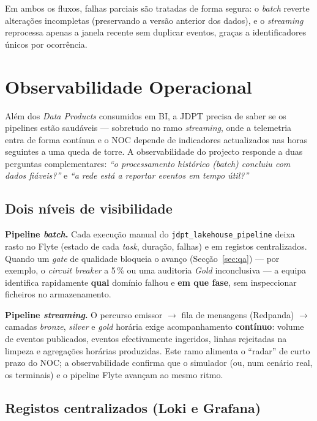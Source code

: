 \documentclass[runningheads]{llncs}
\begin{document}
Em ambos os fluxos, falhas parciais são tratadas de forma segura: o \textit{batch} reverte alterações incompletas (preservando a versão anterior dos dados), e o \textit{streaming} reprocessa apenas a janela recente sem duplicar eventos, graças a identificadores únicos por ocorrência.


\section{Observabilidade Operacional}
\label{sec:observability}

Além dos \textit{Data Products} consumidos em BI, a JDPT precisa de saber se os pipelines estão saudáveis --- sobretudo no ramo \textit{streaming}, onde a telemetria entra de forma contínua e o NOC depende de indicadores actualizados nas horas seguintes a uma queda de torre. A observabilidade do projecto responde a duas perguntas complementares: \emph{``o processamento histórico (\textit{batch}) concluiu com dados fiáveis?''} e \emph{``a rede está a reportar eventos em tempo útil?''}


\subsection{Dois níveis de visibilidade}

\textbf{Pipeline \textit{batch}.}
Cada execução manual do \texttt{jdpt\_lakehouse\_pipeline} deixa rasto no Flyte (estado de cada \textit{task}, duração, falhas) e em registos centralizados. Quando um \textit{gate} de qualidade bloqueia o avanço (Secção~\ref{sec:qa}) --- por exemplo, o \textit{circuit breaker} a 5\,\% ou uma auditoria \textit{Gold} inconclusiva --- a equipa identifica rapidamente \textbf{qual} domínio falhou e \textbf{em que fase}, sem inspeccionar ficheiros no armazenamento.

\textbf{Pipeline \textit{streaming}.}
O percurso emissor $\rightarrow$ fila de mensagens (Redpanda) $\rightarrow$ camadas \textit{bronze}, \textit{silver} e \textit{gold} horária exige acompanhamento \textbf{contínuo}: volume de eventos publicados, eventos efectivamente ingeridos, linhas rejeitadas na limpeza e agregações horárias produzidas. Este ramo alimenta o ``radar'' de curto prazo do NOC; a observabilidade confirma que o simulador (ou, num cenário real, os terminais) e o pipeline Flyte avançam ao mesmo ritmo.


\subsection{Registos centralizados (Loki e Grafana)}
\end{document}
